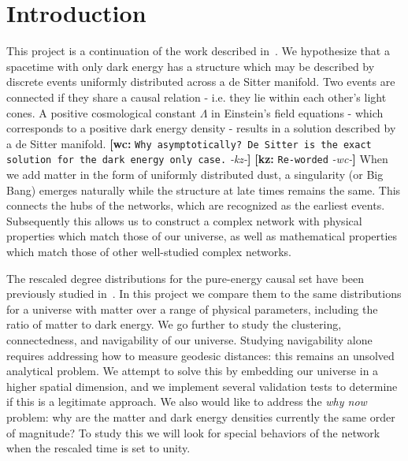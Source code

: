 \documentclass[preprint,notitlepage,amsmath,amssymb,floatfix]{revtex4-1}
\newcommand{\XXX}[3]{{\bf [#1: } {\tt #3} {\it -#2-}{\bf ]}}
\begin{document}
\section{Introduction}
This project is a continuation of the work described in~\cite{ref:nc2012}.  
We hypothesize that a spacetime with only dark energy has a structure which may be described by discrete events uniformly distributed across a de Sitter manifold.  
Two events are connected if they share a causal relation - i.e. they lie within each other's light cones.  
A positive cosmological constant $\Lambda$ in Einstein's field equations - which corresponds to a positive dark energy density - results in a solution described by a de Sitter manifold.
\XXX{wc}{kz}{Why asymptotically? De Sitter is the exact solution for the dark energy only case.} \XXX{kz}{wc}{Re-worded}
When we add matter in the form of uniformly distributed dust, a singularity (or Big Bang) emerges naturally while the structure at late times remains the same.  
This connects the hubs of the networks, which are recognized as the earliest events.
Subsequently this allows us to construct a complex network with physical properties which match those of our universe, as well as mathematical properties which match those of other well-studied complex networks. \par
The rescaled degree distributions for the pure-energy causal set have been previously studied in~\cite{ref:nc2012}.
In this project we compare them to the same distributions for a universe with matter over a range of physical parameters, including the ratio of matter to dark energy.
We go further to study the clustering, connectedness, and navigability of our universe.
Studying navigability alone requires addressing how to measure geodesic distances:  this remains an unsolved analytical problem.
We attempt to solve this by embedding our universe in a higher spatial dimension, and we implement several validation tests to determine if this is a legitimate approach.
We also would like to address the \textit{why now} problem:  why are the matter and dark energy densities currently the same order of magnitude?
To study this we will look for special behaviors of the network when the rescaled time is set to unity.

\end{document}
